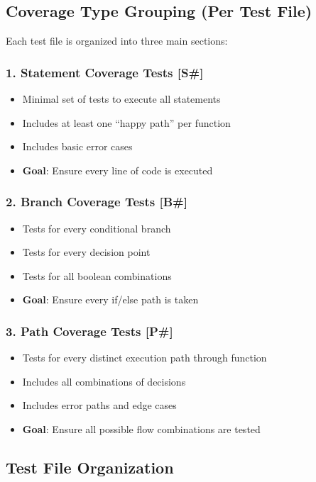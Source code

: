 \subsection{Coverage Type Grouping (Per Test File)}

Each test file is organized into three main sections:

\subsubsection{1. Statement Coverage Tests [S\#]}
\begin{itemize}
    \item Minimal set of tests to execute all statements
    \item Includes at least one ``happy path'' per function
    \item Includes basic error cases
    \item \textbf{Goal}: Ensure every line of code is executed
\end{itemize}

\subsubsection{2. Branch Coverage Tests [B\#]}
\begin{itemize}
    \item Tests for every conditional branch
    \item Tests for every decision point
    \item Tests for all boolean combinations
    \item \textbf{Goal}: Ensure every if/else path is taken
\end{itemize}

\subsubsection{3. Path Coverage Tests [P\#]}
\begin{itemize}
    \item Tests for every distinct execution path through function
    \item Includes all combinations of decisions
    \item Includes error paths and edge cases
    \item \textbf{Goal}: Ensure all possible flow combinations are tested
\end{itemize}

\subsection{Test File Organization}


